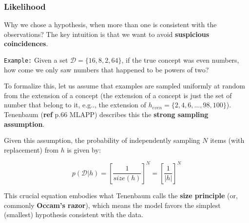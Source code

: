 \documentclass{article}
\makeatletter
\DeclareRobustCommand\onedot{\futurelet\@let@token\@onedot}
\def\@onedot{\ifx\@let@token.\else.\null\fi\xspace}
\def\eg{e.g\onedot} \def\Eg{E.g\onedot}
\makeatother
\begin{document}
\subsubsection{Likelihood}

Why we chose a hypothesis, when more than one is consistent with the observations? The key intuition is that we want to avoid \textbf{suspicious coincidences}. 
\newline

\texttt{Example:}
Given a set $\mathcal{D} = \{16,8,2,64\}$, if the true concept was even numbers, how come we only saw numbers that happened to be powers of two?

To formalize this, let us assume that examples are sampled uniformly at random from the extension of a concept (the extension of a concept is just the set of number that belong to it, \eg, the extension of $h_{even} = \{2,4,6,...,98,100\}$).
Tenenbaum (\textbf{ref} p.66 MLAPP) describes this the \textbf{strong sampling assumption}.

Given this assumption, the probability of independently sampling $N$ items (with replacement) from $h$ is given by:

\begin{equation}
  p(\mathcal{D}|h) = \left[\dfrac{1}{size(h)}\right]^N = \left[\dfrac{1}{|h|}\right]^N
\end{equation}

This crucial equation embodies what Tenenbaum calls the \textbf{size principle} (or, commonly \textbf{Occam's razor}), which means the model favors the simplest (smallest) hypothesis consistent with the data.






\printbibliography
\end{document}
